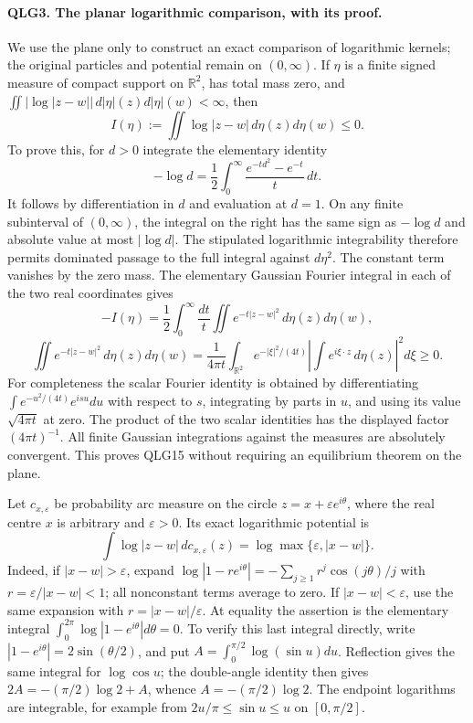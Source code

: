 \documentclass[11pt,a4paper]{article}
\begin{document}
\paragraph{QLG3. The planar logarithmic comparison, with its proof.}
We use the plane only to construct an exact comparison of logarithmic
kernels; the original particles and potential remain on \((0,\infty)\).
If \(\eta\) is a finite signed measure of compact support on
\(\mathbb R^2\), has total mass zero, and
\(\iint|\log|z-w||\,d|\eta|(z)d|\eta|(w)<\infty\), then
\[
 I(\eta):=\iint\log|z-w|\,d\eta(z)d\eta(w)\leq0.
 \tag{QLG15}
\]
To prove this, for \(d>0\) integrate the elementary identity
\[
 -\log d=\frac12\int_0^\infty
                    \frac{e^{-td^2}-e^{-t}}{t}\,dt.
\]
It follows by differentiation in \(d\) and evaluation at \(d=1\).
On any finite subinterval of \((0,\infty)\), the integral on the
right has the same sign as \(-\log d\) and absolute value at most
\(|\log d|\). The stipulated logarithmic integrability therefore
permits dominated passage to the full integral against \(d\eta^2\).
The constant term vanishes by the zero mass. The elementary Gaussian
Fourier integral in each of the two real coordinates gives
\[
 -I(\eta)=\frac12\int_0^\infty\frac{dt}{t}
       \iint e^{-t|z-w|^2}\,d\eta(z)d\eta(w),
\]
\[
 \iint e^{-t|z-w|^2}\,d\eta(z)d\eta(w)
 =\frac1{4\pi t}\int_{\mathbb R^2}
       e^{-|\xi|^2/(4t)}
       \left|\int e^{i\xi\cdot z}\,d\eta(z)\right|^2d\xi\geq0.
 \tag{QLG16}
\]
For completeness the scalar Fourier identity is obtained by
differentiating \(\int e^{-u^2/(4t)}e^{isu}du\) with respect to
\(s\), integrating by parts in \(u\), and using its value
\(\sqrt{4\pi t}\) at zero. The product of the two scalar identities
has the displayed factor \((4\pi t)^{-1}\). All finite Gaussian
integrations against the measures are absolutely convergent. This
proves QLG15 without requiring an equilibrium theorem on the plane.

Let \(c_{x,\varepsilon}\) be probability arc measure on the circle
\(z=x+\varepsilon e^{i\theta}\), where the real centre \(x\) is
arbitrary and \(\varepsilon>0\). Its exact logarithmic potential is
\[
 \int\log|z-w|\,dc_{x,\varepsilon}(z)
           =\log\max\{\varepsilon,|x-w|\}.
 \tag{QLG17}
\]
Indeed, if \(|x-w|>\varepsilon\), expand
\(\log|1-re^{i\theta}|=-\sum_{j\geq1}r^j\cos(j\theta)/j\)
with \(r=\varepsilon/|x-w|<1\); all nonconstant terms average to
zero. If \(|x-w|<\varepsilon\), use the same expansion with
\(r=|x-w|/\varepsilon\). At equality the assertion is the elementary
integral \(\int_0^{2\pi}\log|1-e^{i\theta}|d\theta=0\).
To verify this last integral directly, write
\(|1-e^{i\theta}|=2\sin(\theta/2)\), and put
\(A=\int_0^{\pi/2}\log(\sin u)du\). Reflection gives the same
integral for \(\log\cos u\); the double-angle identity then gives
\(2A=-(\pi/2)\log2+A\), whence \(A=-(\pi/2)\log2\).
The endpoint logarithms are integrable, for example from
\(2u/\pi\leq\sin u\leq u\) on \([0,\pi/2]\).
\end{document}
